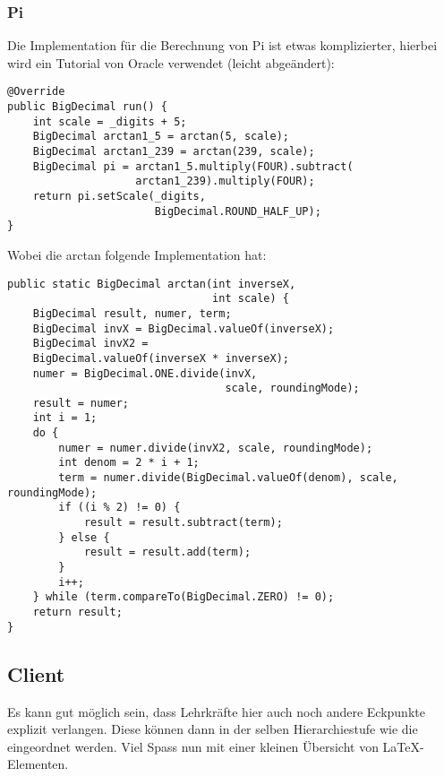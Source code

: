 \subsubsection{Pi}
Die Implementation für die Berechnung von Pi ist etwas komplizierter, hierbei wird ein Tutorial von Oracle verwendet (leicht abgeändert):

\begin{lstlisting}[style=Java, caption=Module Implementation - Pi run]
@Override
public BigDecimal run() {
	int scale = _digits + 5;
    BigDecimal arctan1_5 = arctan(5, scale);
    BigDecimal arctan1_239 = arctan(239, scale);
    BigDecimal pi = arctan1_5.multiply(FOUR).subtract(
					arctan1_239).multiply(FOUR);
    return pi.setScale(_digits,
                       BigDecimal.ROUND_HALF_UP);
}
\end{lstlisting}

Wobei die arctan folgende Implementation hat:

\begin{lstlisting}[style=Java, caption=Module Implementation - Pi arctan]
public static BigDecimal arctan(int inverseX,
                                int scale) {
	BigDecimal result, numer, term;
    BigDecimal invX = BigDecimal.valueOf(inverseX);
    BigDecimal invX2 =
    BigDecimal.valueOf(inverseX * inverseX);
	numer = BigDecimal.ONE.divide(invX,
    							  scale, roundingMode);
    result = numer;
    int i = 1;
    do {
		numer = numer.divide(invX2, scale, roundingMode);
		int denom = 2 * i + 1;
        term = numer.divide(BigDecimal.valueOf(denom), scale, roundingMode);
		if ((i % 2) != 0) {
        	result = result.subtract(term);
        } else {
            result = result.add(term);
        }
        i++;
    } while (term.compareTo(BigDecimal.ZERO) != 0);
    return result;
}
\end{lstlisting}
\subsection{Client}


Es kann gut möglich sein, dass Lehrkräfte hier auch noch andere Eckpunkte explizit verlangen. Diese können dann in der selben Hierarchiestufe wie die \textit{} eingeordnet werden. Viel Spass nun mit einer kleinen Übersicht von \LaTeX-Elementen.


